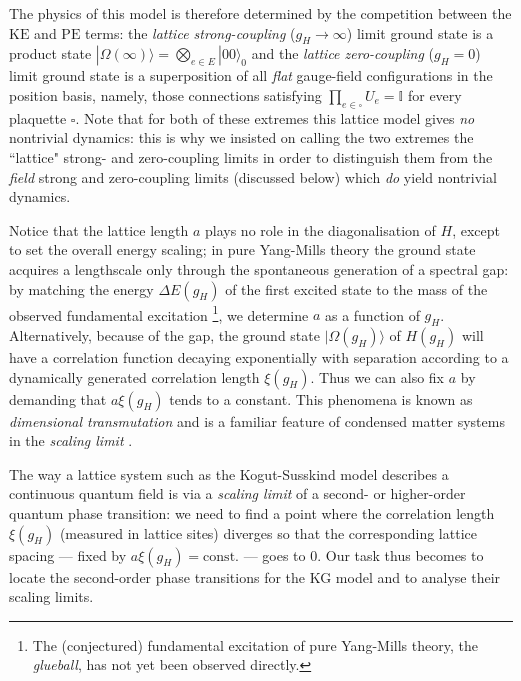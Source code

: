 \documentclass[twocolumn,lengthcheck,superscriptaddress]{revtex4-1}
\theoremstyle{definition}
\theoremstyle{remark}
\begin{document}
The physics of this model is therefore determined by the competition between the $\text{KE}$ and $\text{PE}$ terms: the \emph{lattice strong-coupling} ($g_H\rightarrow \infty$) limit ground state is a product state $|\Omega(\infty)\rangle = \bigotimes_{e\in E} |00\rangle_0$ and the \emph{lattice zero-coupling} ($g_H=0$) limit ground state is a superposition of all \emph{flat} gauge-field configurations in the position basis, namely, those connections satisfying $\prod_{e\in \square} U_e = \mathbb{I}$ for every plaquette $\square$. Note that for both of these extremes this lattice model gives \emph{no} nontrivial dynamics: this is why we insisted on calling the two extremes the ``lattice" strong- and zero-coupling limits in order to distinguish them from the \emph{field} strong and zero-coupling limits (discussed below) which \emph{do} yield nontrivial dynamics.

Notice that the lattice length $a$ plays no role in the diagonalisation of $H$, except to set the overall energy scaling; in pure Yang-Mills theory the ground state acquires a lengthscale only through the spontaneous generation of a spectral gap:  by matching the energy $\Delta E(g_H)$ of the first excited state to the mass of the observed fundamental excitation \footnote{The (conjectured) fundamental excitation of pure Yang-Mills theory, the \emph{glueball}, has not yet been observed directly.}, we determine $a$ as a function of $g_H$. Alternatively, because of the gap, the ground state $|\Omega(g_H)\rangle$ of $H(g_H)$ will have a correlation function decaying exponentially with separation according to a dynamically generated correlation length $\xi(g_H)$. Thus we can also fix $a$ by demanding that $a\xi(g_H)$ tends to a constant. This phenomena is known as \emph{dimensional transmutation} and is a familiar feature of condensed matter systems in the \emph{scaling limit} \cite{sachdev:2011a}.

The way a lattice system such as the Kogut-Susskind model describes a continuous quantum field is via a \emph{scaling limit} of a second- or higher-order quantum phase transition: we need to find a point where the correlation length $\xi(g_H)$ (measured in lattice sites) diverges so that the corresponding lattice spacing --- fixed by $a\xi(g_H) = \text{const.}$ --- goes to $0$. 
Our task thus becomes to locate the second-order phase transitions for the KG model and to analyse their scaling limits. 
\end{document}
